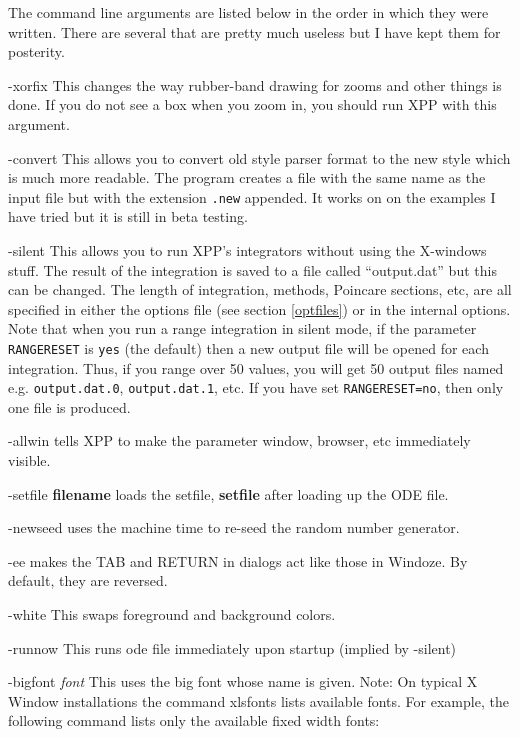 The command line arguments are listed below in the order in which they were written. There are several that are pretty much useless but I have kept them for posterity. 
\begin{description}
\item{-xorfix} This changes the way rubber-band drawing for zooms and
other things is done. If you do not see a box when you zoom in, you
should run XPP with this argument.
\item{-convert}  This allows you to convert old style parser format to
the new style which is much more readable. The program creates a file
with the same name as the input file but with the extension {\tt .new}
appended. It works on on the examples I have tried but it is still in
beta testing.
\item{-silent} This allows you to run XPP's integrators without using
the X-windows stuff.  The result of the integration is saved to a file
called ``output.dat'' but this can be changed. The length of
integration, methods, Poincare sections, etc, are all specified in
either the options file (see section \ref{optfiles})
 or in the internal options. Note that when you run a range integration
in silent mode, if the parameter {\tt RANGERESET} is {\tt yes} (the default) 
then a new output file will be opened for each integration. Thus, if you range 
over 50 values, you will get 50 output files named e.g. {\tt output.dat.0}, 
{\tt output.dat.1}, etc. If you have set {\tt RANGERESET=no}, then only
one file is produced.
\item{-allwin} tells XPP to make the parameter window, browser, etc
immediately visible.
\item{-setfile {\bf filename}} loads the setfile, {\bf setfile} after
loading up the  ODE file.
\item{-newseed} uses the machine time to re-seed the random number
generator. 
\item{-ee} makes the TAB and RETURN in dialogs act like those in
Windoze. By default, they are reversed.  
\item{-white} This swaps foreground and background colors. 
\item{-runnow} This runs ode file immediately upon startup (implied by -silent)
\item{-bigfont \emph{font}} This uses the big font whose name is given. Note:  On  typical  X  Window  installations the command xlsfonts lists
       available fonts.  For example, the following  command  lists  only  the
       available fixed width fonts:

\end{description}
